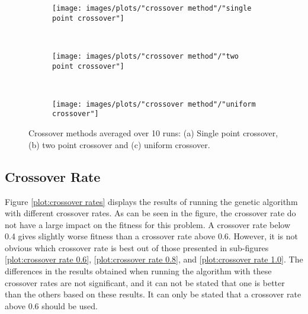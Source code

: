 \begin{figure}[h!]
    \centering
    \begin{subfigure}[b]{0.31\textwidth}
        \texttt{[image: images/plots/"crossover method"/"single point crossover"]}
        \caption{}
        \hfill
        \label{plot:single point crossover}
    \end{subfigure}
    ~
    \begin{subfigure}[b]{0.31\textwidth}
        \texttt{[image: images/plots/"crossover method"/"two point crossover"]}
        \caption{}
        \hfill
        \label{plot:two point crossover}
    \end{subfigure}
    ~
    \begin{subfigure}[b]{0.31\textwidth}
        \texttt{[image: images/plots/"crossover method"/"uniform crossover"]}
        \caption{}
        \hfill
        \label{plot:uniform crossover}
    \end{subfigure}
    \caption{Crossover methods averaged over 10 runs: (a) Single point crossover, (b) two point crossover and (c) uniform crossover.}
    \label{plot:crossover methods}
\end{figure}


\subsection{Crossover Rate}
Figure \ref{plot:crossover rates} displays the results of running the genetic algorithm with different crossover rates. As can be seen in the figure, the crossover rate do not have a large impact on the fitness for this problem. A crossover rate below 0.4 gives slightly worse fitness than a crossover rate above 0.6. However, it is not obvious which crossover rate is best out of those presented in sub-figures \ref{plot:crossover rate 0.6}, \ref{plot:crossover rate 0.8}, and \ref{plot:crossover rate 1.0}. The differences in the results obtained when running the algorithm with these crossover rates are not significant, and it can not be stated that one is better than the others based on these results. It can only be stated that a crossover rate above 0.6 should be used. \\


